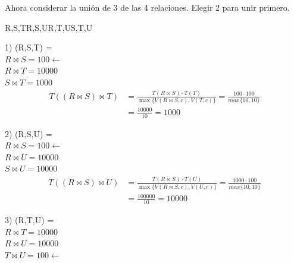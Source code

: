 \documentclass{templateNote}
\begin{document}
\begin{enumerate}
\begin{enumerate}[label=\alph*)]
                \noindent Ahora considerar la unión de 3 de las 4 relaciones. Elegir 2 para unir primero.\\
                \begin{center}
                    {R,S,T}{R,S,U}{R,T,U}{S,T,U}
                \end{center}

                1) (R,S,T) = \\
                \hspace*{0.25cm}$R \Join S = 100  \leftarrow$ \\
                \hspace*{0.25cm}$R \Join T = 10000$ \\
                \hspace*{0.25cm}$S \Join T = 1000$ 
                \begin{align*}
                    T((R \Join S) \Join T) &= \frac{T(R \Join S)\cdot T(T)}{\max\{V(R \Join S,c),V(T,c)\}} = \frac{100\cdot100}{max\{10,10\}} \\ 
                    &= \frac{10000}{10} = 1000 
                \end{align*}
                
                2) (R,S,U) = \\
                \hspace*{0.25cm}$R \Join S = 100 \leftarrow$ \\
                \hspace*{0.25cm}$R \Join U = 10000$ \\
                \hspace*{0.25cm}$S \Join U = 10000$ \\

                \begin{align*}
                    T((R \Join S) \Join U) &= \frac{T(R \Join S)\cdot T(U)}{\max\{V(R \Join S,c),V(U,c)\}} = \frac{1000\cdot100}{max\{10,10\}} \\ 
                    &= \frac{100000}{10} = 10000
                \end{align*}
                
                3) (R,T,U) = \\
                \hspace*{0.25cm}$R \Join T = 10000$ \\
                \hspace*{0.25cm}$R \Join U = 10000$ \\
                \hspace*{0.25cm}$T \Join U = 100 \leftarrow$


\end{enumerate}
\end{enumerate}
\end{document}

